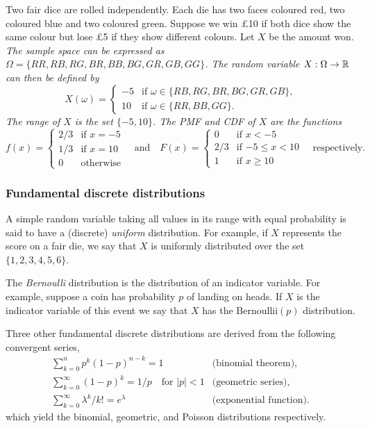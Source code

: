 \begin{example}\label{example:coloured_dice_game}
Two fair dice are rolled independently. Each die has two faces coloured red, two coloured blue and two coloured green. Suppose we win \pounds 10 if both dice show the same colour but lose \pounds 5 if they show different colours. Let $X$ be the amount won.
\bit
\it The sample space can be expressed as $\Omega=\{RR,RB,RG,BR,BB,BG,GR,GB,GG\}$.
\it The random variable $X:\Omega\to\mathbb{R}$ can then be defined by
\[
X(\omega) = \begin{cases}
	-5	& \text{if $\omega\in\{RB,RG,BR,BG,GR,GB\}$,} \\
	10	& \text{if $\omega\in\{RR,BB,GG\}$.}
\end{cases}
\]
\it The range of $X$ is the set $\{-5,10\}$.
\it The PMF and CDF of $X$ are the functions
\[
f(x) = \begin{cases}
	2/3	& \text{if $x = -5$} \\
	1/3	& \text{if $x = 10$} \\
	0	& \text{otherwise}
\end{cases}
\quad\text{and}\quad
F(x) = \begin{cases}
	0	& \text{if $x < -5$} \\
	2/3	& \text{if $-5 \leq x < 10$} \\
	1	& \text{if $x \geq 10$}
\end{cases}
\quad\text{respectively}.
\]
\eit
\end{example}

\subsubsection*{Fundamental discrete distributions}
A simple random variable taking all values in its range with equal probability is said to have a (discrete) \emph{uniform} distribution. For example, if $X$ represents the score on a fair die, we say that $X$ is uniformly distributed over the set $\{1,2,3,4,5,6\}$. 

The \emph{Bernoulli} distribution is the distribution of an indicator variable. For example, suppose a coin has probability $p$ of landing on heads. If $X$ is the indicator variable of this event we say that $X$ has the $\text{Bernoullii}(p)$ distribution.

Three other fundamental discrete distributions are derived from the following convergent series,
\[
\begin{array}{ll}
\displaystyle\sum_{k=0}^n p^k(1-p)^{n-k} 		= 1  						& \text{(binomial theorem)}, \\
\displaystyle\sum_{k=0}^{\infty} (1-p)^k 		= 1/p \quad\text{for $|p|<1$} 	& \text{(geometric series)}, \\
\displaystyle\sum_{k=0}^{\infty} \lambda^k/k!	= e^{\lambda}	 			& \text{(exponential function)}.
\end{array}
\]
which yield the binomial, geometric, and Poisson distributions respectively. 

